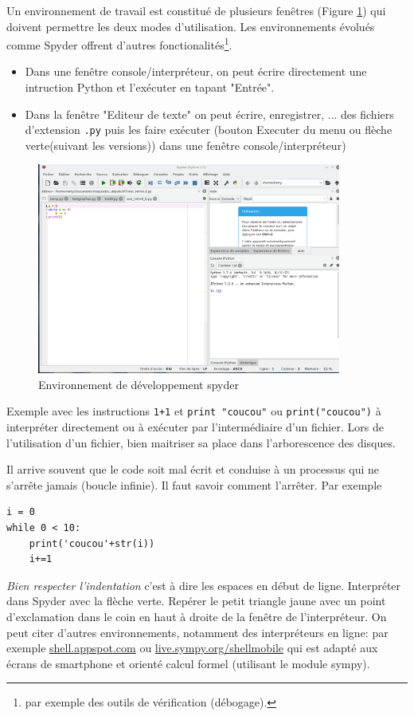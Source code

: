 Un environnement de travail est constitué de plusieurs fenêtres (Figure \ref{fig:spyder}) qui doivent permettre les deux modes d'utilisation. Les environnements évolués comme Spyder offrent d'autres fonctionalités\footnote{par exemple des outils de vérification (débogage).}.
\begin{itemize}
 \item Dans une fenêtre console/interpréteur, on peut écrire directement une intruction Python et l'exécuter en tapant "Entrée". 
 \item Dans la fenêtre "Editeur de texte" on peut écrire, enregistrer, ... des fichiers d'extension \verb|.py| puis les faire exécuter (bouton Executer du menu ou flèche verte(suivant les versions)) dans une fenêtre console/interpréteur)
\end{itemize}
 
 \begin{figure}[h!]
 \centering
 \includegraphics[width=10cm]{environnement_1.png}
 \caption{Environnement de développement spyder}
 \label{fig:spyder}
\end{figure}


Exemple avec les instructions \texttt{1+1} et \texttt{print "coucou"} ou \texttt{print("coucou")} à interpréter directement ou à exécuter par l'intermédiaire d'un fichier. Lors de l'utilisation d'un fichier, bien maitriser sa place dans l'arborescence des disques.

Il arrive souvent que le code soit mal écrit et conduise à un processus qui ne s'arrête jamais (boucle infinie). Il faut savoir comment l'arrêter.
Par exemple
 \begin{verbatim}
i = 0
while 0 < 10:
    print('coucou'+str(i))
    i+=1
 \end{verbatim}
\emph{Bien respecter l'indentation} c'est à dire les espaces en début de ligne. Interpréter dans Spyder avec la flèche verte. Repérer le petit triangle jaune avec un point d'exclamation dans le coin en haut à droite de la fenêtre de l'interpréteur.
On peut citer d'autres environnements, notamment des interpréteurs en ligne: par exemple \href{http://shell.appspot.com}{shell.appspot.com} ou \href{http://live.sympy.org/shellmobile}{live.sympy.org/shellmobile} qui est adapté aux écrans de smartphone et orienté calcul formel  (utilisant le module sympy). 
